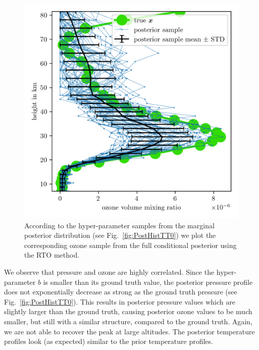 \begin{figure}[ht!]
	\centering
	\includegraphics{FullO3Res.png}
	\caption[Pressure posterior samples.]{According to the hyper-parameter samples from the marginal posterior distribution (see Fig.~\ref{fig:PostHistTT0}) we plot the corresponding ozone sample from the full conditional posterior using the RTO method.}
	\label{fig:O3Post}
\end{figure}

We observe that pressure and ozone are highly correlated.
Since the hyper-parameter $b$ is smaller than its ground truth value, the posterior pressure profile does not exponentially decrease as strong as the ground truth pressure (see Fig.~\ref{fig:PostHistTT0}).
This results in posterior pressure values which are slightly larger than the ground truth, causing posterior ozone values to be much smaller, but still with a similar structure, compared to the ground truth.
Again, we are not able to recover the peak at large altitudes.
The posterior temperature profiles look (as expected) similar to the prior temperature profiles.
\clearpage




